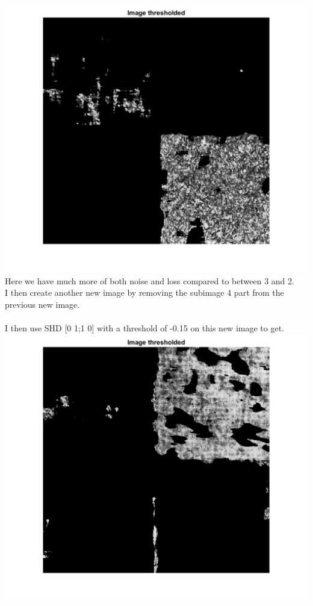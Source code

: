 \documentclass[12pt, letterpaper, twoside]{article}
\begin{document}
\includegraphics[scale=0.7]{"1sub4seg.png"}\\
Here we have much more of both noise and loss compared to between 3 and 2.\\
I then create another new image by removing the subimage 4 part from the previous new image.\\
\newpage
\ \\
I then use SHD [0 1;1 0] with a threshold of -0.15 on this new image to get.\\
\includegraphics[scale=0.7]{"1sub2seg.png"}\\
\end{document}
